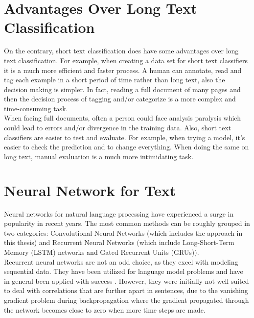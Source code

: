 \section{Advantages Over Long Text Classification}
On the contrary, short text classification does have some advantages over long text classification. For example, when creating a data set for short text classifiers it is a much more efficient and faster process. A human can annotate, read and tag each example in a short period of time rather than long text, also the decision making is simpler. In fact, reading a full document of many pages and then the decision process of tagging and/or categorize is a more complex and time-consuming task.\\

When facing full documents, often a person could face analysis paralysis \cite{Bonn2007} which could lead to errors and/or divergence in the training data.
Also, short text classifiers are easier to test and evaluate. For example, when trying a model, it’s easier to check the prediction and to change everything. When doing the same on long text, manual evaluation is a much more intimidating task.


\section{Neural Network for Text}
Neural networks for natural language processing have experienced a surge in popularity in recent years. The most common methods can be roughly grouped in two categories: Convolutional Neural Networks (which includes the approach in this thesis) and Recurrent Neural Networks (which include Long-Short-Term Memory (LSTM) networks and Gated Recurrent Units (GRUs)).\\

Recurrent neural networks are not an odd choice, as they excel with modeling sequential data. They have been utilized for language model problems and have in general been applied with success \cite{Mikolov2010a, Chung2014, Lai2015, Howard2018, Xu}. However, they were initially not well-suited to deal with correlations that are further apart in sentences, due to the vanishing gradient problem during backpropagation where the gradient propagated through the network becomes close to zero when more time steps are made.\\ 

